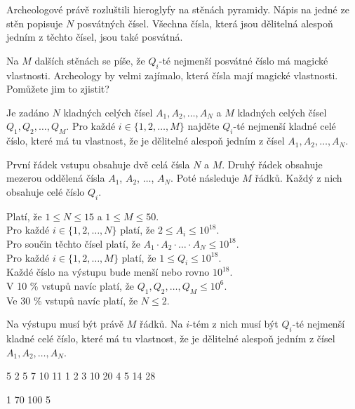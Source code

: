 
\usepackage[czech]{babel}





Archeologové právě rozluštili hieroglyfy na stěnách pyramidy. Nápis na jedné ze
stěn popisuje $N$ posvátných čísel. Všechna čísla, která jsou dělitelná alespoň
jedním z těchto čísel, jsou také posvátná.

Na $M$ dalších stěnách se píše, že $Q_i$-té nejmenší posvátné číslo má magické
vlastnosti. Archeology by velmi zajímalo, která čísla mají magické vlastnosti.
Pomůžete jim to zjistit?


Je zadáno $N$ kladných celých čísel $A_1, A_2, \ldots, A_N$ a $M$ kladných
celých čísel $Q_1, Q_2, \ldots, Q_M$. Pro každé $i \in \{ 1, 2, \ldots, M \}$
najděte $Q_i$-té nejmenší kladné celé číslo, které má tu vlastnost, že je
dělitelné alespoň jedním z čísel $A_1, A_2, \ldots, A_N$.


První řádek vstupu obsahuje dvě celá čísla $N$ a $M$. Druhý řádek obsahuje
mezerou oddělená čísla $A_1$, $A_2$, $\ldots$, $A_N$. Poté následuje $M$ řádků.
Každý z nich obsahuje celé číslo $Q_i$.

\bigskip
\noindent
Platí, že $1 \leq N \leq 15$ a $1 \leq M \leq 50$.\\
Pro každé $i \in \{ 1, 2, \ldots, N \}$ platí, že $2 \leq A_i \leq 10^{18}$.\\
Pro součin těchto čísel platí, že $A_1 \cdot A_2 \cdot \ldots \cdot A_N \leq 10^{18}$.\\
Pro každé $i \in \{ 1, 2, \ldots, M \}$ platí, že $1 \leq Q_i \leq 10^{18}$.\\
Každé číslo na výstupu bude menší nebo rovno $10^{18}$.\\
V 10 \% vstupů navíc platí, že $Q_1, Q_2, \ldots, Q_M \leq 10^6$.\\
Ve 30 \% vstupů navíc platí, že $N \leq 2$.


Na výstupu musí být právě $M$ řádků. Na $i$-tém z nich musí být $Q_i$-té
nejmenší kladné celé číslo, které má tu vlastnost, že je dělitelné alespoň
jedním z čísel $A_1, A_2, \ldots, A_N$.


 5
2 5 7 10 11
1
2
3
10
20
4
5
14
28
\sampleEND

 1
70 100
5
\sampleEND


